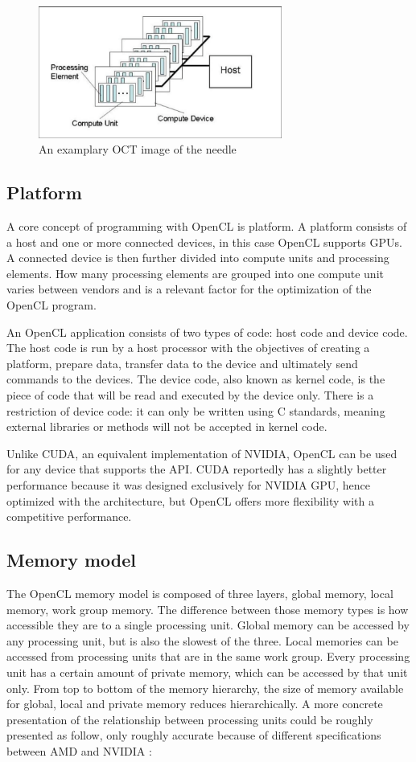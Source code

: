 \begin{figure}[H]
	\centering
	\includegraphics[width=8cm]{images/OpenCLModel.png}
	\caption{An examplary OCT image of the needle}
	\label{ExampleOCTImage}
\end{figure}
\pagebreak
\subsection{Platform}
A core concept of programming with OpenCL is platform. A platform consists of a host and one or more connected devices, in this case OpenCL supports GPUs. A connected device is then further divided into compute units and processing elements. How many processing elements  are grouped into one compute unit varies between vendors and is a relevant factor for the optimization of the OpenCL program. 

An OpenCL application consists of two types of code: host code and device code. The host code is run by a host processor with the objectives of creating a platform, prepare data, transfer data to the device and ultimately send commands to the devices. The device code, also known as kernel code, is the piece of code that will be read and executed by the device only. There is a restriction of device code: it can only be written using C standards, meaning external libraries or methods will not be accepted in kernel code. 

Unlike CUDA, an equivalent implementation of NVIDIA, OpenCL can be used for any device that supports the API. CUDA reportedly has a slightly better performance because it was  designed exclusively for NVIDIA GPU, hence optimized with the architecture, but OpenCL offers more flexibility with a competitive performance. 
\subsection{Memory model}
The OpenCL memory model is composed of three layers, global memory, local memory, work group memory. The difference between those memory types is how accessible they are to a single processing unit. Global memory can be accessed by any processing unit, but is also the slowest of the three. Local memories can be accessed from processing units that are in the same work group. Every processing unit has a certain amount of private memory, which can be accessed by that unit only. From top to bottom of the memory hierarchy, the size of memory available for global, local and private memory reduces hierarchically. A more concrete presentation of the relationship between processing units could be roughly presented as follow, only roughly accurate because of different specifications between AMD and NVIDIA \cite{openclplatform}:

